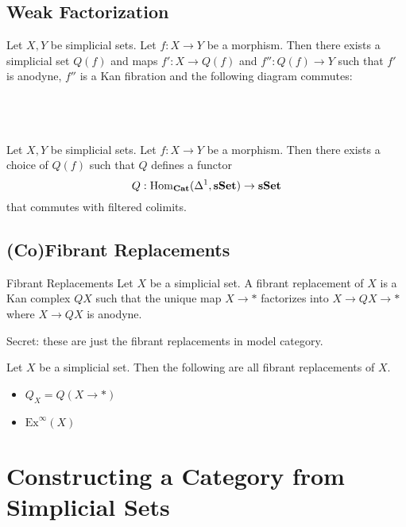 \documentclass[a4paper]{article}
\begin{document}
\subsection{Weak Factorization}
\begin{prp}{}{} Let $X,Y$ be simplicial sets. Let $f:X\to Y$ be a morphism. Then there exists a simplicial set $Q(f)$ and maps $f':X\to Q(f)$ and $f'':Q(f)\to Y$ such that $f'$ is anodyne, $f''$ is a Kan fibration and the following diagram commutes: \\~\\
\\~\\
\end{prp}

\begin{prp}{}{} Let $X,Y$ be simplicial sets. Let $f:X\to Y$ be a morphism. Then there exists a choice of $Q(f)$ such that $Q$ defines a functor $$Q:\operatorname{Hom}_\bold{Cat}(\Delta^1,\bold{sSet})\to\bold{sSet}$$ that commutes with filtered colimits. 
\end{prp}

\subsection{(Co)Fibrant Replacements}
\begin{defn}{Fibrant Replacements}{} Let $X$ be a simplicial set. A fibrant replacement of $X$ is a Kan complex $QX$ such that the unique map $X\to\ast$ factorizes into $X\to QX\to\ast$ where $X\to QX$ is anodyne. 
\end{defn}

Secret: these are just the fibrant replacements in model category. 

\begin{lmm}{}{} Let $X$ be a simplicial set. Then the following are all fibrant replacements of $X$. 
\begin{itemize}
\item $Q_X=Q(X\to\ast)$
\item $\text{Ex}^\infty(X)$
\end{itemize}
\end{lmm}

\pagebreak
\section{Constructing a Category from Simplicial Sets}
\end{document}
